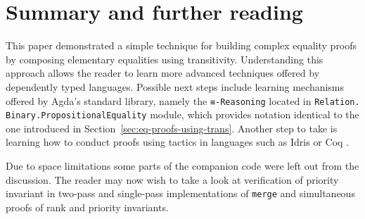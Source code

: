 \section{Summary and further reading}

This paper demonstrated a simple technique for building complex equality proofs by composing elementary equalities using transitivity. Understanding this approach allows the reader to learn more advanced techniques offered by dependently typed languages. Possible next steps include learning mechanisms offered by Agda's standard library, namely the \texttt{≡-Reasoning} located in \texttt{Relation.} \texttt{Binary.}\texttt{PropositionalEquality} module, which provides notation identical to the one introduced in Section~\ref{sec:eq-proofs-using-trans}. Another step to take is learning how to conduct proofs using tactics in languages such as Idris \cite{Bra13} or Coq \cite{coq}.

Due to space limitations some parts of the companion code were left out from the discussion. The reader may now wish to take a look at verification of priority invariant in two-pass and single-pass implementations of \texttt{merge} and simultaneous proofs of rank and priority invariants.
